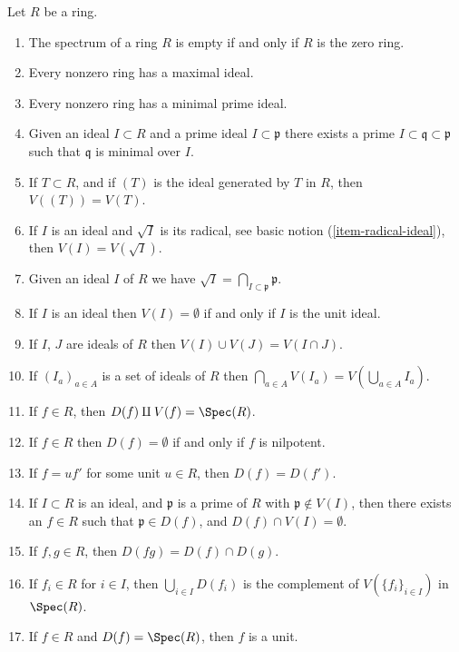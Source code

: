 \begin{lemma}
\label{lemma-Zariski-topology}
Let $R$ be a ring.
\begin{enumerate}
\item The spectrum of a ring $R$ is empty if and only if $R$
is the zero ring.
\item Every nonzero ring has a maximal ideal.
\item Every nonzero ring has a minimal prime ideal.
\item Given an ideal $I \subset R$ and a prime ideal
$I \subset \mathfrak p$ there exists a prime
$I \subset \mathfrak q \subset \mathfrak p$ such
that $\mathfrak q$ is minimal over $I$.
\item If $T \subset R$, and if $(T)$ is the ideal generated by
$T$ in $R$, then $V((T)) = V(T)$.
\item If $I$ is an ideal and $\sqrt{I}$ is its radical,
see basic notion (\ref{item-radical-ideal}), then $V(I) = V(\sqrt{I})$.
\item Given an ideal $I$ of $R$ we have $\sqrt{I} =
\bigcap_{I \subset \mathfrak p} \mathfrak p$.
\item If $I$ is an ideal then $V(I) = \emptyset$ if and only
if $I$ is the unit ideal.
\item If $I$, $J$ are ideals of $R$ then $V(I) \cup V(J) =
V(I \cap J)$.
\item If $(I_a)_{a\in A}$ is a set of ideals of $R$ then
$\bigcap_{a\in A} V(I_a) = V(\bigcup_{a\in A} I_a)$.
\item If $f \in R$, then $D(f) \amalg V(f) = \Spec(R)$.
\item If $f \in R$ then $D(f) = \emptyset$ if and only if $f$
is nilpotent.
\item If $f = u f'$ for some unit $u \in R$, then $D(f) = D(f')$.
\item If $I \subset R$ is an ideal, and $\mathfrak p$ is a prime of
$R$ with $\mathfrak p \not\in V(I)$, then there exists an $f \in R$
such that $\mathfrak p \in D(f)$, and $D(f) \cap V(I) = \emptyset$.
\item If $f, g \in R$, then $D(fg) = D(f) \cap D(g)$.
\item If $f_i \in R$ for $i \in I$, then
$\bigcup_{i\in I} D(f_i)$ is the complement of $V(\{f_i \}_{i\in I})$
in $\Spec(R)$.
\item If $f \in R$ and $D(f) = \Spec(R)$, then $f$ is a unit.
\end{enumerate}
\end{lemma}

